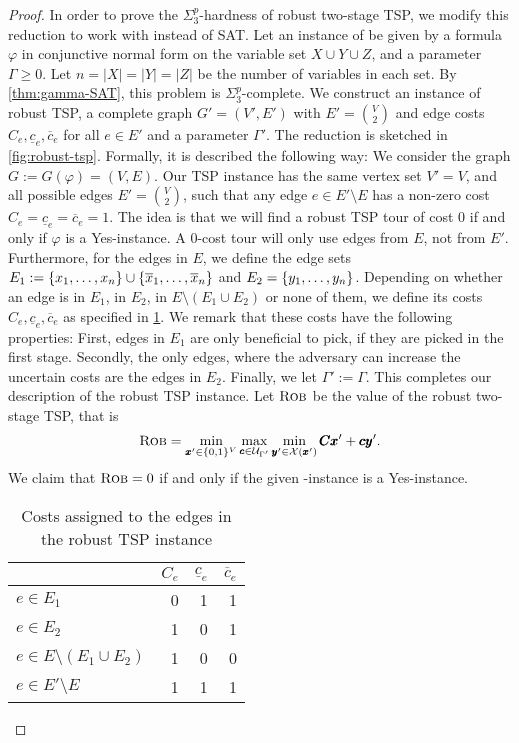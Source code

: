 \begin{proof}
In order to prove the $\Sigma_3^p$-hardness of robust two-stage TSP, we modify this reduction to work with {\radj} instead of SAT. 
Let an instance of {\radj} be given by a formula $\varphi$ in conjunctive normal form on the variable set $X \cup Y \cup Z$, and a parameter $\Gamma \geq 0$. 
Let $n = |X| = |Y| = |Z|$ be the number of variables in each set. 
By \cref{thm:gamma-SAT}, this problem is $\Sigma_3^p$-complete. 
We construct an instance of robust TSP,  a complete graph $G' = (V',E')$ with $E' = {V \choose 2}$ and edge costs $C_e, \underline{c}_e, \overline{c}_e$ for all $e \in E'$ and a parameter $\Gamma'$.
The reduction is sketched in \cref{fig:robust-tsp}. Formally, it is described the following way:
We consider the graph $G := G(\varphi) = (V,E)$. Our TSP instance has the same vertex set $V' = V$, and all possible edges $E' = {V \choose 2}$, such that any edge $e \in E' \setminus E$ has a non-zero cost $C_e = \underline{c}_e = \overline{c}_e = 1$. 
The idea is that we will find a robust TSP tour of cost 0 if and only if $\varphi$ is a Yes-instance. A 0-cost tour will only use edges from $E$, not from $E'$.
 Furthermore, for the edges in $E$, we define the edge sets $E_1 := \{ x_1, \ldots, x_n \} \cup \{ \overline{x}_1, \ldots, \overline{x}_n \}$ and $E_2 = \{ y_1, \ldots, y_n \}$.
Depending on whether an edge is in $E_1$, in $E_2$, in $E \setminus (E_1 \cup E_2)$ or none of them, we define its costs $C_e, \underline{c}_e, \overline{c}_e$ as specified in \cref{table:tsp}. 
We remark that these costs have the following properties: First, edges in $E_1$ are only beneficial to pick, if they are picked in the first stage. 
Secondly, the only edges, where the adversary can increase the uncertain costs are the edges in $E_2$.
Finally, we let $\Gamma' := \Gamma$. This completes our description of the robust TSP instance.
Let $\textsc{Rob}$ be the value of the robust two-stage TSP, that is
\begin{equation}
\textsc{Rob} = \min_{\pmb x' \in \{ 0,1 \}^V} \max_{\pmb c \in \mathcal{U}_{\Gamma'} } \min_{\pmb y' \in \mathcal{X}(\pmb x')} \pmb C \pmb x' + \pmb c \pmb y'. \label{eq:two-stage-tsp}
\end{equation} 
We claim that $\textsc{Rob} = 0$ if and only if the given {\radj}-instance is a Yes-instance.
\begin{table}
\centering
\begin{tabular}{l|rrr}
& $C_e$ & $\underline{c}_e$ & $\overline{c}_e$ \\
\hline
$e \in E_1$ & 0 & 1 & 1 \\
$e \in E_2$ & 1 & 0 & 1 \\
$e \in E \setminus (E_1 \cup E_2)$ & 1 & 0 & 0 \\
$e \in E' \setminus E$ & 1 & 1 & 1
\end{tabular}
\caption{Costs assigned to the edges in the robust TSP instance}
\label{table:tsp}
\end{table}


\end{proof}
